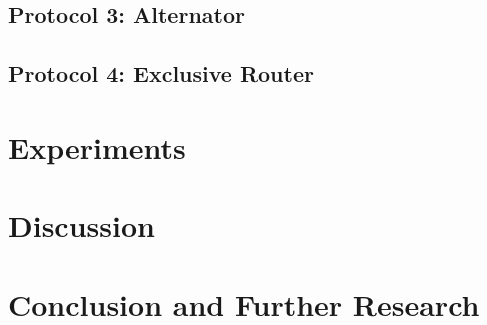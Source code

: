 \documentclass{article}
\begin{document}
\subsection{Protocol 3: Alternator}

\subsection{Protocol 4: Exclusive Router}

\section{Experiments}

\section{Discussion}

\section{Conclusion and Further Research}

\newpage



\end{document}
